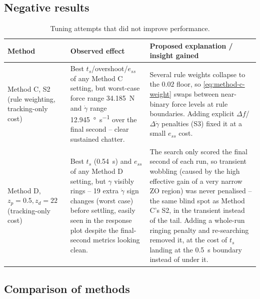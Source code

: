 \documentclass[11pt,a4paper]{article}
\newcommand{\gam}{\ensuremath{\gamma}}
\newcommand{\gamdot}{\ensuremath{\dot{\gamma}}}
\newcommand{\ts}{\ensuremath{t_s}}
\newcommand{\sse}{\ensuremath{e_{ss}}}
\begin{document}
\subsection{Negative results}
\label{sec:negative}

\begin{table}[H]
\centering
\small
\begin{tabular}{@{}p{2.4cm}p{4.6cm}p{8.0cm}@{}}
\toprule
\textbf{Method} & \textbf{Observed effect} & \textbf{Proposed explanation / insight gained} \\
\midrule
Method C, S2 (rule weighting, tracking-only cost) &
Best $\ts$/overshoot/$\sse$ of any Method C setting, but worst-case force
range \SI{34.185}{\N} and $\gamdot$ range \SI{12.945}{\degree\per\s} over
the final second -- clear sustained chatter. &
Several rule weights collapse to the $0.02$ floor, so
\eqref{eq:method-c-weight} swaps between near-binary force levels at rule
boundaries. Adding explicit $\Delta f$/$\Delta\gamdot$ penalties (S3) fixed
it at a small $\sse$ cost. \\
Method D, $z_p=0.5,z_d=22$ (tracking-only cost) &
Best $\ts$ (\SI{0.54}{\s}) and $\sse$ of any Method D setting, but $\gam$
visibly rings -- 19 extra $\gamdot$ sign changes (worst case) before
settling, easily seen in the response plot despite the final-second metrics
looking clean. &
The search only scored the final second of each run, so transient wobbling
(caused by the high effective gain of a very narrow ZO region) was never
penalised -- the same blind spot as Method C's S2, in the transient instead
of the tail. Adding a whole-run ringing penalty and re-searching removed it,
at the cost of $\ts$ landing at the \SI{0.5}{\s} boundary instead of under
it. \\
\bottomrule
\end{tabular}
\caption{Tuning attempts that did not improve performance.}
\label{tab:negative}
\end{table}

\subsection{Comparison of methods}
\label{sec:comparison}
\end{document}

